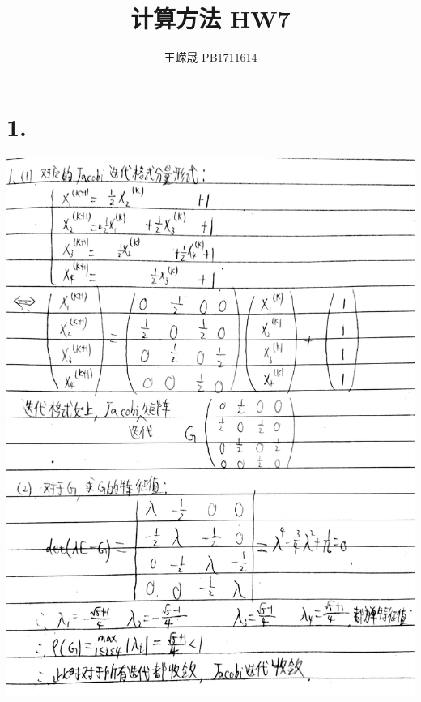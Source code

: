 \documentclass{article}
\title{计算方法 HW7}
\author{王嵘晟 \quad PB1711614}
\date{}
\begin{document}
	\maketitle
	\section*{1.}
	\includegraphics*[scale = 0.12]{1.jpg}
\end{document}
